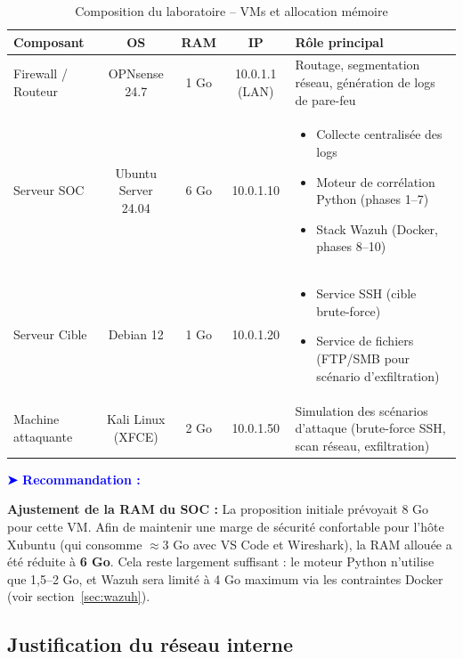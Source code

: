 \documentclass[12pt,a4paper]{article}
\newenvironment{recommandation}{
    \vspace{0.5em}
    \noindent\textbf{\textcolor{blue}{➤ Recommandation :}}\hspace{0.5em}
}{
    \vspace{0.5em}
}
\begin{document}
\begin{table}[H]
\centering
\caption{Composition du laboratoire – VMs et allocation mémoire}
\label{tab:lab-vms}
\begin{tabular}{|l|c|c|c|p{5cm}|}
\hline
\textbf{Composant} & \textbf{OS} & \textbf{RAM} & \textbf{IP} & \textbf{Rôle principal} \\
\hline
Firewall / Routeur   & OPNsense 24.7    & 1 Go  & 10.0.1.1 (LAN) & Routage, segmentation réseau, génération de logs de pare-feu \\
\hline
Serveur SOC          & Ubuntu Server 24.04 & 6 Go  & 10.0.1.10    & \begin{itemize}[leftmargin=*,nosep]
    \item Collecte centralisée des logs
    \item Moteur de corrélation Python (phases 1–7)
    \item Stack Wazuh (Docker, phases 8–10)
\end{itemize} \\
\hline
Serveur Cible        & Debian 12         & 1 Go  & 10.0.1.20    & \begin{itemize}[leftmargin=*,nosep]
    \item Service SSH (cible brute-force)
    \item Service de fichiers (FTP/SMB pour scénario d'exfiltration)
\end{itemize} \\
\hline
Machine attaquante   & Kali Linux (XFCE) & 2 Go  & 10.0.1.50    & Simulation des scénarios d'attaque (brute-force SSH, scan réseau, exfiltration) \\
\hline
\end{tabular}
\end{table}

\begin{recommandation}
\textbf{Ajustement de la RAM du SOC :} La proposition initiale prévoyait 8 Go pour cette VM. Afin de maintenir une marge de sécurité confortable pour l'hôte Xubuntu (qui consomme $\approx 3$ Go avec VS Code et Wireshark), la RAM allouée a été réduite à \textbf{6 Go}. Cela reste largement suffisant : le moteur Python n'utilise que 1,5–2 Go, et Wazuh sera limité à 4 Go maximum via les contraintes Docker (voir section~\ref{sec:wazuh}).
\end{recommandation}

\subsection{Justification du réseau interne}
\end{document}
